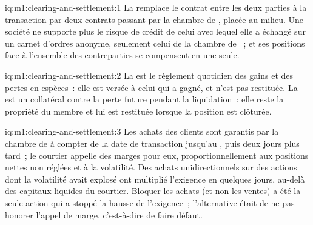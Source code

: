\begin{solution}{iq:m1:clearing-and-settlement:1}
La  remplace le contrat entre les deux parties à la transaction par deux
contrats passant par la chambre de , placée au milieu. Une société ne supporte plus le
risque de crédit de celui avec lequel elle a échangé sur un carnet d'ordres anonyme, seulement celui de la
chambre de ~; et ses positions face à l'ensemble des
contreparties se compensent en une seule.
\end{solution}

\begin{solution}{iq:m1:clearing-and-settlement:2}
La  est le règlement quotidien des gains et des pertes en espèces~: elle est
versée à celui qui a gagné, et n'est pas restituée. La  est un collatéral contre
la perte future pendant la liquidation~: elle reste la propriété du membre et
lui est restituée lorsque la position est clôturée.
\end{solution}

\begin{solution}{iq:m1:clearing-and-settlement:3}
Les achats des clients sont garantis par la chambre de  à compter de la date de transaction jusqu'au
, puis deux jours plus tard~; le courtier appelle des marges pour eux,
proportionnellement aux positions nettes non réglées et à la volatilité. Des achats
unidirectionnels sur des actions dont la volatilité avait explosé ont multiplié l'exigence en
quelques jours, au-delà des capitaux liquides du courtier. Bloquer les achats (et non les ventes) a été
la seule action qui a stoppé la hausse de l'exigence~; l'alternative était
de ne pas honorer l'appel de marge, c'est-à-dire de faire défaut.
\end{solution}

